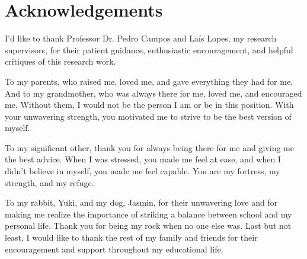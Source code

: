 \chapter*{Acknowledgements}

I'd like to thank Professor Dr. Pedro Campos and Laís Lopes, my research supervisors, for their patient guidance, enthusiastic encouragement, and helpful critiques of this research work. 

To my parents, who raised me, loved me, and gave everything they had for me. And to my grandmother, who was always there for me, loved me, and encouraged me. Without them, I would not be the person I am or be in this position. With your unwavering strength, you motivated me to strive to be the best version of myself.

To my significant other, thank you for always being there for me and giving me the best advice. When I was stressed, you made me feel at ease, and when I didn't believe in myself, you made me feel capable. You are my fortress, my strength, and my refuge.

To my rabbit, Yuki, and my dog, Jasmin, for their unwavering love and for making me realize the importance of striking a balance between school and my personal life. Thank you for being my rock when no one else was. Last but not least, I would like to thank the rest of my family and friends for their encouragement and support throughout my educational life.